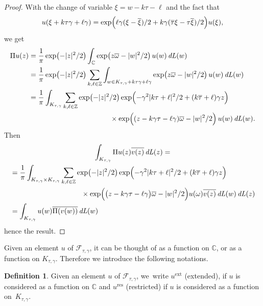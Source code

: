 \documentclass[JEP,XML,SOM,Unicode,NoFloatCountersInSection,published]{cedram}
\newcommand{\ext}{\mathrm{ext}}
\newcommand{\res}{\mathrm{res}}
\DeclareMathOperator{\dL}{\mathit{dL}}
\theoremstyle{definition}
\newtheorem{df}[theorem]{Definition}
\let\om\omega
\let\EE\exp
\let\ov\overline
\newcommand\C{\mathbb C}
\newcommand\Z{\mathbb Z}
\begin{document}
\begin{proof} With the change of variable $\xi=w-k\tau-\ell$ and the fact that\vspace*{-3pt}
\[
u(\xi+k\tau \gamma+\ell \gamma)=\EE\Bigl({\ell \gamma(\xi-\ov\xi)/2+k\gamma(\ov{\tau}\xi-\tau\ov\xi)/2}\Bigr)u(\xi),
\]
we get\vspace*{-3pt}
\begin{align*}
\Pi u(z)&=\frac1{\pi}\EE\bigl({-|z|^{2}/2}\bigr)\int_{\C}\EE\bigl(z\ov{\om}-|w|^{2}/2\bigr)\,u(w) \dL(w)\\
&=\frac1{\pi}\EE\bigl({-|z|^{2}/2}\bigr)\sum_{k,\ell\in \Z}\int_{w\in K_{\tau,\gamma}+k\tau \gamma+\ell \gamma}\EE\bigl(z\ov{\om}-|w|^{2}/2\bigr)\,u(w) \dL(w)\\
&=\frac1{\pi}\int_{ K_{\tau,\gamma}}\sum_{k,\ell\in \Z}\EE\bigl({-|z|^{2}/2}\bigr) \EE\Bigl({-{\gamma^2}|k\tau+\ell|^{2}/2+(k\ov\tau+\ell)\gamma z}\Bigr)\\
&\hspace{4cm}\times \EE\Bigl({(z-k\gamma \tau-\ell\gamma)\ov{\om}-|w|^{2}/2}\Bigr)\,u(w) \dL(w).
\end{align*}
Then\vspace*{-3pt}
\begin{multline*}
\int_{K_{\tau,\gamma}} \Pi u(z) \ov{v(z)}\dL(z)=\\
\begin{aligned}
&=\frac1{\pi}\int_{ K_{\tau,\gamma}\times K_{\tau,\gamma}}\sum_{k,\ell\in \Z}\EE\bigl({-|z|^{2}/2}\bigr) \EE\Bigl({-{\gamma^2}|k\tau+\ell|^{2}/2+(k\ov\tau+\ell)\gamma z}\Bigr)\\
&\hspace{3.5cm}\times \EE\Bigl({\bigl(z-k\gamma \tau-\ell\gamma\bigr)\ov{\om}-|w|^{2}/2}\Bigr)u(\om)\ov{v(z)}\dL(w) \dL(z)\\
&=\int_{K_{\tau,\gamma}} u(w) \ov{\Pi(v(w))}\dL(w)
\end{aligned}
\end{multline*}
hence the result.
\end{proof}

Given an element $u$ of $\mathcal{F}_{\tau,\gamma}$, it can be thought of as a function on $\mathbb{C}$, or as a function on $K_{\tau,\gamma}$. Therefore we introduce the following notations.

\begin{df}
Given an element $u$ of $\mathcal{F}_{\tau,\gamma}$, we~write $u^{\ext}$ (extended), if $u$ is considered as a function on $\mathbb{C}$ and $u^{\res}$ (restricted) if $u$ is considered as a function on~$K_{\tau,\gamma}$.
\end{df}
\end{document}
